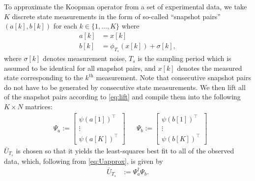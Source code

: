 To approximate the Koopman operator from a set of experimental data, we take $K$ discrete state measurements in the form of so-called ``snapshot pairs'' $(a[k] , b[k])$ for each $k \in \{1,\ldots,K\}$ where
\begin{align}
    a[k] &= x[k] \\
    b[k] &= \phi_{T_s} (x[k]) + \sigma[k],
    \label{eq:ab}
\end{align}
where $\sigma[k]$ denotes measurement noise, $T_s$ is the sampling period which is assumed to be identical for all snapshot pairs, and $x[k]$ denotes the measured state corresponding to the $k^\text{th}$ measurement.
Note that consecutive snapshot pairs do not have to be generated by consecutive state measurements. 
We then lift all of the snapshot pairs according to \eqref{eq:lift} and compile them into the following ${K \times N}$ matrices:
\begin{align}
    &\Psi_a := \begin{bmatrix} {\psi}(a[1])^\top \\ \vdots \\  {\psi}(a[K])^\top \end{bmatrix}
    &&\Psi_b := \begin{bmatrix} {\psi}(b[1])^\top \\ \vdots \\  {\psi}(b[K])^\top \end{bmatrix}
    \label{eq:Psi}
\end{align}
$\bar{U}_{T_s}$ is chosen so that it yields the least-squares best fit to all of the observed data, which, following from \eqref{eq:Uapprox}, is given by 
\begin{align}
    \bar{U}_{T_s} &:= \Psi_a^\dagger \Psi_b.
\end{align}

